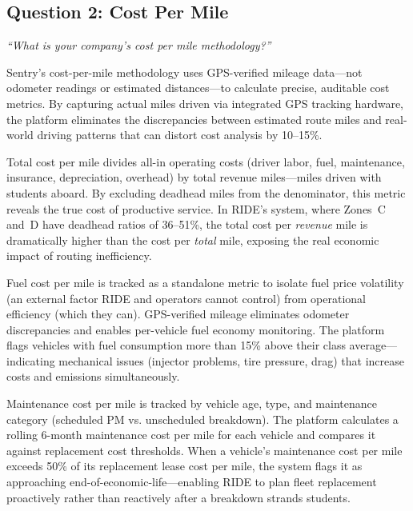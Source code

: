 \subsection{Question 2: Cost Per Mile}
\textit{``What is your company's cost per mile methodology?''}

\vspace{0.3cm}

Sentry's cost-per-mile methodology uses GPS-verified mileage data---not odometer readings or estimated distances---to calculate precise, auditable cost metrics. By capturing actual miles driven via integrated GPS tracking hardware, the platform eliminates the discrepancies between estimated route miles and real-world driving patterns that can distort cost analysis by 10--15\%.

\begin{description}[style=nextline, leftmargin=0.5cm]
    \item[\faIcon{road} \textbf{Total Cost Per Mile:}] Total cost per mile divides all-in operating costs (driver labor, fuel, maintenance, insurance, depreciation, overhead) by total revenue miles---miles driven with students aboard. By excluding deadhead miles from the denominator, this metric reveals the true cost of productive service. In RIDE's system, where Zones~C and~D have deadhead ratios of 36--51\%, the total cost per \textit{revenue} mile is dramatically higher than the cost per \textit{total} mile, exposing the real economic impact of routing inefficiency.

    \item[\faIcon{gas-pump} \textbf{Fuel Cost Per Mile:}] Fuel cost per mile is tracked as a standalone metric to isolate fuel price volatility (an external factor RIDE and operators cannot control) from operational efficiency (which they can). GPS-verified mileage eliminates odometer discrepancies and enables per-vehicle fuel economy monitoring. The platform flags vehicles with fuel consumption more than 15\% above their class average---indicating mechanical issues (injector problems, tire pressure, drag) that increase costs and emissions simultaneously.

    \item[\faIcon{wrench} \textbf{Maintenance Cost Per Mile:}] Maintenance cost per mile is tracked by vehicle age, type, and maintenance category (scheduled PM vs. unscheduled breakdown). The platform calculates a rolling 6-month maintenance cost per mile for each vehicle and compares it against replacement cost thresholds. When a vehicle's maintenance cost per mile exceeds 50\% of its replacement lease cost per mile, the system flags it as approaching end-of-economic-life---enabling RIDE to plan fleet replacement proactively rather than reactively after a breakdown strands students.


\end{description}

